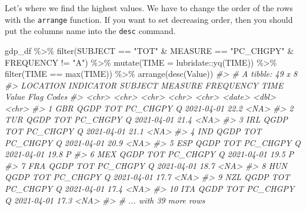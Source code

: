 \documentclass[
]{article}
\newenvironment{Shaded}{\begin{snugshade}}{\end{snugshade}}
\newcommand{\AttributeTok}[1]{\textcolor[rgb]{0.77,0.63,0.00}{#1}}
\newcommand{\CommentTok}[1]{\textcolor[rgb]{0.56,0.35,0.01}{\textit{#1}}}
\newcommand{\FunctionTok}[1]{\textcolor[rgb]{0.00,0.00,0.00}{#1}}
\newcommand{\NormalTok}[1]{#1}
\newcommand{\SpecialCharTok}[1]{\textcolor[rgb]{0.00,0.00,0.00}{#1}}
\newcommand{\StringTok}[1]{\textcolor[rgb]{0.31,0.60,0.02}{#1}}
\begin{document}
Let's where we find the highest values. We have to change the order of the rows with the \texttt{arrange} function. If you want to set decreasing order, then you should put the columns name into the \texttt{desc} command.

\begin{Shaded}
\begin{Highlighting}[]
\NormalTok{gdp\_df }\SpecialCharTok{\%\textgreater{}\%} 
  \FunctionTok{filter}\NormalTok{(SUBJECT }\SpecialCharTok{==} \StringTok{"TOT"} \SpecialCharTok{\&}\NormalTok{ MEASURE }\SpecialCharTok{==} \StringTok{"PC\_CHGPY"} \SpecialCharTok{\&}\NormalTok{ FREQUENCY }\SpecialCharTok{!=} \StringTok{"A"}\NormalTok{) }\SpecialCharTok{\%\textgreater{}\%} 
  \FunctionTok{mutate}\NormalTok{(}\AttributeTok{TIME =}\NormalTok{ lubridate}\SpecialCharTok{::}\FunctionTok{yq}\NormalTok{(TIME)) }\SpecialCharTok{\%\textgreater{}\%} 
  \FunctionTok{filter}\NormalTok{(TIME }\SpecialCharTok{==} \FunctionTok{max}\NormalTok{(TIME)) }\SpecialCharTok{\%\textgreater{}\%}
  \FunctionTok{arrange}\NormalTok{(}\FunctionTok{desc}\NormalTok{(Value)) }
\CommentTok{\#\textgreater{} \# A tibble: 49 x 8}
\CommentTok{\#\textgreater{}    LOCATION INDICATOR SUBJECT MEASURE  FREQUENCY TIME       Value \textasciigrave{}Flag Codes\textasciigrave{}}
\CommentTok{\#\textgreater{}    \textless{}chr\textgreater{}    \textless{}chr\textgreater{}     \textless{}chr\textgreater{}   \textless{}chr\textgreater{}    \textless{}chr\textgreater{}     \textless{}date\textgreater{}     \textless{}dbl\textgreater{} \textless{}chr\textgreater{}       }
\CommentTok{\#\textgreater{}  1 GBR      QGDP      TOT     PC\_CHGPY Q         2021{-}04{-}01  22.2 \textless{}NA\textgreater{}        }
\CommentTok{\#\textgreater{}  2 TUR      QGDP      TOT     PC\_CHGPY Q         2021{-}04{-}01  21.4 \textless{}NA\textgreater{}        }
\CommentTok{\#\textgreater{}  3 IRL      QGDP      TOT     PC\_CHGPY Q         2021{-}04{-}01  21.1 \textless{}NA\textgreater{}        }
\CommentTok{\#\textgreater{}  4 IND      QGDP      TOT     PC\_CHGPY Q         2021{-}04{-}01  20.9 \textless{}NA\textgreater{}        }
\CommentTok{\#\textgreater{}  5 ESP      QGDP      TOT     PC\_CHGPY Q         2021{-}04{-}01  19.8 P           }
\CommentTok{\#\textgreater{}  6 MEX      QGDP      TOT     PC\_CHGPY Q         2021{-}04{-}01  19.5 P           }
\CommentTok{\#\textgreater{}  7 FRA      QGDP      TOT     PC\_CHGPY Q         2021{-}04{-}01  18.7 \textless{}NA\textgreater{}        }
\CommentTok{\#\textgreater{}  8 HUN      QGDP      TOT     PC\_CHGPY Q         2021{-}04{-}01  17.7 \textless{}NA\textgreater{}        }
\CommentTok{\#\textgreater{}  9 NZL      QGDP      TOT     PC\_CHGPY Q         2021{-}04{-}01  17.4 \textless{}NA\textgreater{}        }
\CommentTok{\#\textgreater{} 10 ITA      QGDP      TOT     PC\_CHGPY Q         2021{-}04{-}01  17.3 \textless{}NA\textgreater{}        }
\CommentTok{\#\textgreater{} \# ... with 39 more rows}
\end{Highlighting}
\end{Shaded}
\end{document}

